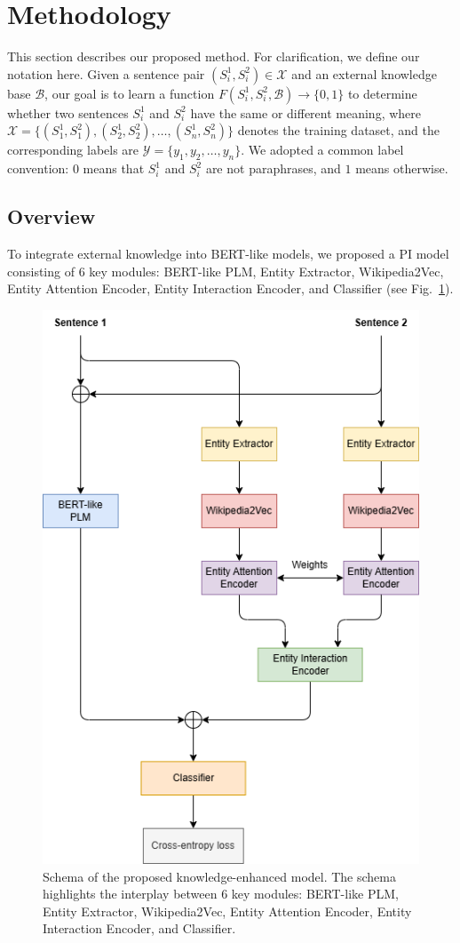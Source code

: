 \documentclass{llncs}
\begin{document}
\section{Methodology}
\label{sec:methodology}

This section describes our proposed method. For clarification, we define our notation here. Given a sentence pair $(S^1_i, S^2_i) \in \mathcal{X}$ and an external knowledge base $\mathcal{B}$, our goal is to learn a function $F(S^1_i, S^2_i, \mathcal{B}) \rightarrow \{0, 1\}$ to determine whether two sentences $S^1_i$ and $S^2_i$ have the same or different meaning, where $\mathcal{X} = \{ (S^1_1, S^2_1), (S^1_2, S^2_2), \dotsc, (S^1_n, S^2_n) \}$ denotes the training dataset, and the corresponding labels are $\mathcal{Y} = \{ y_1, y_2, \dotsc, y_n \}$. We adopted a common label convention: $0$ means that $S^1_i$ and $S^2_i$ are not paraphrases, and $1$ means otherwise.

\subsection{Overview}

To integrate external knowledge into BERT-like models, we proposed a PI model consisting of 6 key modules: BERT-like PLM, Entity Extractor, Wikipedia2Vec, Entity Attention Encoder, Entity Interaction Encoder, and Classifier (see Fig.~\ref{fig:WikiPhoBERT}).

\begin{figure}[H]
    \centering
    \includegraphics[width=0.5\linewidth, height=0.4\textheight]{images/WikiPhoBERT.png}
    \caption{Schema of the proposed knowledge-enhanced model. The schema highlights the interplay between 6 key modules: BERT-like PLM, Entity Extractor, Wikipedia2Vec, Entity Attention Encoder, Entity Interaction Encoder, and Classifier.}
    \label{fig:WikiPhoBERT}
\end{figure}
\end{document}
